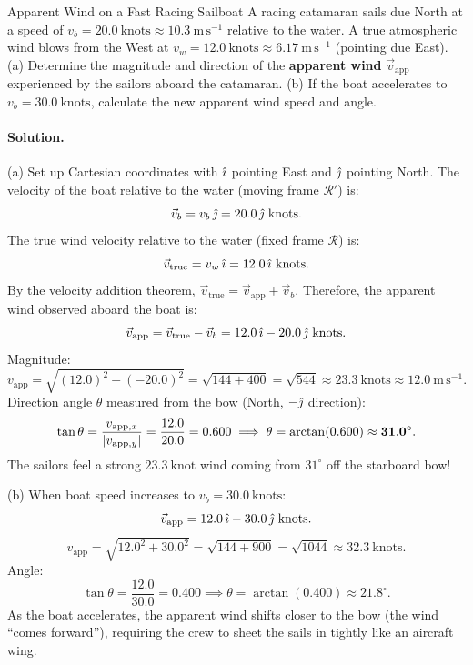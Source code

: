 \begin{workedexample}{Apparent Wind on a Fast Racing Sailboat}
A racing catamaran sails due North at a speed of $v_b = 20.0\ \mathrm{knots} \approx 10.3\ \mathrm{m\,s^{-1}}$ relative to the water.
A true atmospheric wind blows from the West at $v_w = 12.0\ \mathrm{knots} \approx 6.17\ \mathrm{m\,s^{-1}}$ (pointing due East).
(a) Determine the magnitude and direction of the \textbf{apparent wind} $\vec{v}_{\text{app}}$ experienced by the sailors aboard the catamaran.
(b) If the boat accelerates to $v_b = 30.0\ \mathrm{knots}$, calculate the new apparent wind speed and angle.

\paragraph{Solution.}

(a) Set up Cartesian coordinates with $\hat{\imath}$ pointing East and $\hat{\jmath}$ pointing North.
The velocity of the boat relative to the water (moving frame $\mathcal{R}'$) is:
\[
\vec{v}_b = v_b\,\jhat = 20.0\,\jhat\ \mathrm{knots}.
\]
The true wind velocity relative to the water (fixed frame $\mathcal{R}$) is:
\[
\vec{v}_{\text{true}} = v_w\,\hat{\imath} = 12.0\,\hat{\imath}\ \mathrm{knots}.
\]
By the velocity addition theorem, $\vec{v}_{\text{true}} = \vec{v}_{\text{app}} + \vec{v}_b$.
Therefore, the apparent wind observed aboard the boat is:
\[
\vec{v}_{\text{app}} = \vec{v}_{\text{true}} - \vec{v}_b = 12.0\,\hat{\imath} - 20.0\,\hat{\jmath}\ \mathrm{knots}.
\]
Magnitude:
\[
v_{\text{app}} = \sqrt{(12.0)^2 + (-20.0)^2} = \sqrt{144 + 400} = \sqrt{544} \approx \mathbf{23.3\ \mathrm{knots}} \approx 12.0\ \mathrm{m\,s^{-1}}.
\]
Direction angle $\theta$ measured from the bow (North, $-\hat{\jmath}$ direction):
\[
\tan\theta = \frac{v_{\text{app}, x}}{\left\lvert v_{\text{app}, y} \right\rvert} = \frac{12.0}{20.0} = 0.600 \implies \theta = \arctan(0.600) \approx \mathbf{31.0^\circ.}
\]
The sailors feel a strong $23.3\ \mathrm{knot}$ wind coming from $31^\circ$ off the starboard bow!

(b) When boat speed increases to $v_b = 30.0\ \mathrm{knots}$:
\[
\vec{v}_{\text{app}} = 12.0\,\hat{\imath} - 30.0\,\hat{\jmath}\ \mathrm{knots}.
\]
\[
v_{\text{app}} = \sqrt{12.0^2 + 30.0^2} = \sqrt{144 + 900} = \sqrt{1044} \approx \mathbf{32.3\ \mathrm{knots}}.
\]
Angle:
\[
\tan\theta = \frac{12.0}{30.0} = 0.400 \implies \theta = \arctan(0.400) \approx \mathbf{21.8^\circ.}
\]
As the boat accelerates, the apparent wind shifts closer to the bow (the wind ``comes forward''), requiring the crew to sheet the sails in tightly like an aircraft wing.
\end{workedexample}
